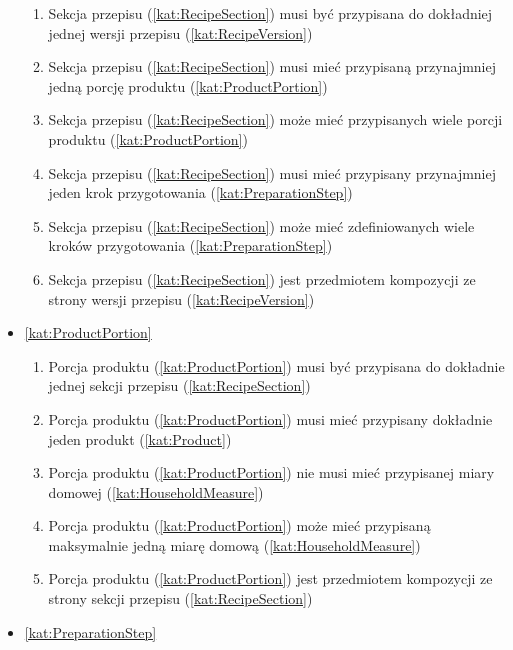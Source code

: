 \begin{itemize}[label={\textbf{Reguły dla}}, wide, labelwidth=!, labelindent=0pt]
\begin{enumerate}[label={\textbf{REG/\protect\threedigits{\arabic{enumi}}}}, wide, labelwidth=!, align=left, leftmargin=3cm, resume]
        \item Sekcja przepisu (\ref{kat:RecipeSection}) musi być przypisana do dokładniej jednej wersji przepisu (\ref{kat:RecipeVersion})
        \item Sekcja przepisu (\ref{kat:RecipeSection}) musi mieć przypisaną przynajmniej jedną porcję produktu (\ref{kat:ProductPortion})
        \item Sekcja przepisu (\ref{kat:RecipeSection}) może mieć przypisanych wiele porcji produktu (\ref{kat:ProductPortion})
        \item Sekcja przepisu (\ref{kat:RecipeSection}) musi mieć przypisany przynajmniej jeden krok przygotowania (\ref{kat:PreparationStep})
        \item Sekcja przepisu (\ref{kat:RecipeSection}) może mieć zdefiniowanych wiele kroków przygotowania (\ref{kat:PreparationStep})
        \item Sekcja przepisu (\ref{kat:RecipeSection}) jest przedmiotem kompozycji ze strony wersji przepisu (\ref{kat:RecipeVersion})
    \end{enumerate}
    \item\ref{kat:ProductPortion}
    \begin{enumerate}[label={\textbf{REG/\protect\threedigits{\arabic{enumi}}}}, wide, labelwidth=!, align=left, leftmargin=3cm, resume]
        \item Porcja produktu (\ref{kat:ProductPortion}) musi być przypisana do dokładnie jednej sekcji przepisu (\ref{kat:RecipeSection})
        \item Porcja produktu (\ref{kat:ProductPortion}) musi mieć przypisany dokładnie jeden produkt (\ref{kat:Product})
        \item Porcja produktu (\ref{kat:ProductPortion}) nie musi mieć przypisanej miary domowej (\ref{kat:HouseholdMeasure})
        \item Porcja produktu (\ref{kat:ProductPortion}) może mieć przypisaną maksymalnie jedną miarę domową (\ref{kat:HouseholdMeasure})
        \item Porcja produktu (\ref{kat:ProductPortion}) jest przedmiotem kompozycji ze strony sekcji przepisu (\ref{kat:RecipeSection})
    \end{enumerate}
    \item\ref{kat:PreparationStep}
    \begin{enumerate}[label={\textbf{REG/\protect\threedigits{\arabic{enumi}}}}, wide, labelwidth=!, align=left, leftmargin=3cm, resume]

\end{enumerate}
\end{itemize}
